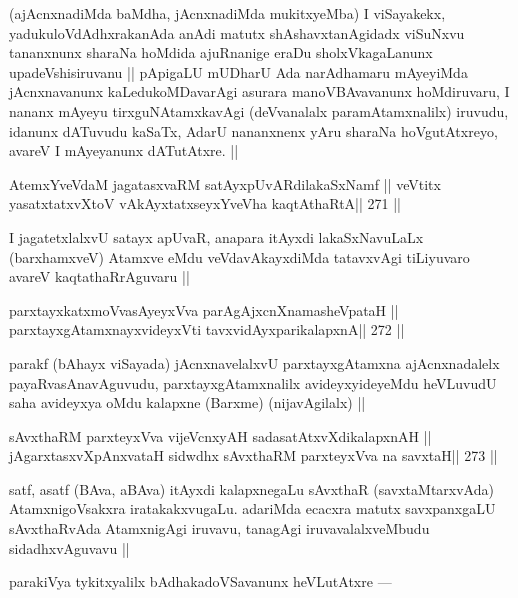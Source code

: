 \begin{artha}
(ajAcnxnadiMda baMdha, jAcnxnadiMda mukitxyeMba) I viSayakekx, yadukuloVdAdhxrakanAda anAdi matutx shAshavxtanAgidadx viSuNxvu tananxnunx sharaNa hoMdida ajuRnanige eraDu sholxVkagaLanunx upadeVshisiruvanu || pApigaLU mUDharU Ada narAdhamaru mAyeyiMda jAcnxnavanunx kaLedukoMDavarAgi asurara manoVBAvavanunx hoMdiruvaru, I nananx mAyeyu tirxguNAtamxkavAgi (deVvanalalx paramAtamxnalilx) iruvudu, idanunx dATuvudu kaSaTx, AdarU nananxnenx yAru sharaNa hoVgutAtxreyo, avareV I mAyeyanunx dATutAtxre. ||
\end{artha}


\begin{shl}
AtemxYveVdaM jagatasxvaRM satAyxpUvARdilakaSxNamf ||
veVtitx yasatxtatxvXtoV vAkAyxtatxseyxYveVha kaqtAthaRtA\hfill || 271 ||
\end{shl}

\begin{artha}
I jagatetxlalxvU satayx apUvaR, anapara itAyxdi lakaSxNavuLaLx (barxhamxveV) Atamxve eMdu veVdavAkayxdiMda tatavxvAgi tiLiyuvaro avareV kaqtathaRrAguvaru ||
\end{artha}

\begin{shl}
parxtayxkatxmoVvasAyeyxVva parAgAjxcnXnamasheVpataH ||
parxtayxgAtamxnayxvideyxVti tavxvidAyxparikalapxnA\hfill || 272 ||
\end{shl}

\begin{artha}
parakf (bAhayx viSayada) jAcnxnavelalxvU parxtayxgAtamxna ajAcnxnadalelx payaRvasAnavAguvudu, parxtayxgAtamxnalilx avideyxyideyeMdu heVLuvudU saha avideyxya oMdu kalapxne (Barxme) (nijavAgilalx) ||
\end{artha}

\begin{shl}
sAvxthaRM parxteyxVva vijeVcnxyAH sadasatAtxvXdikalapxnAH ||
jAgarxtasxvXpAnxvataH sidwdhx sAvxthaRM parxteyxVva na savxtaH\hfill || 273 ||
\end{shl}

\begin{artha}
satf, asatf (BAva, aBAva) itAyxdi kalapxnegaLu sAvxthaR (savxtaMtarxvAda) AtamxnigoVsakxra iratakakxvugaLu. adariMda ecacxra matutx savxpanxgaLU sAvxthaRvAda AtamxnigAgi iruvavu, tanagAgi iruvavalalxveMbudu sidadhxvAguvavu ||
\end{artha}

\begin{artha}
parakiVya tykitxyalilx bAdhakadoVSavanunx heVLutAtxre ---
\end{artha}

